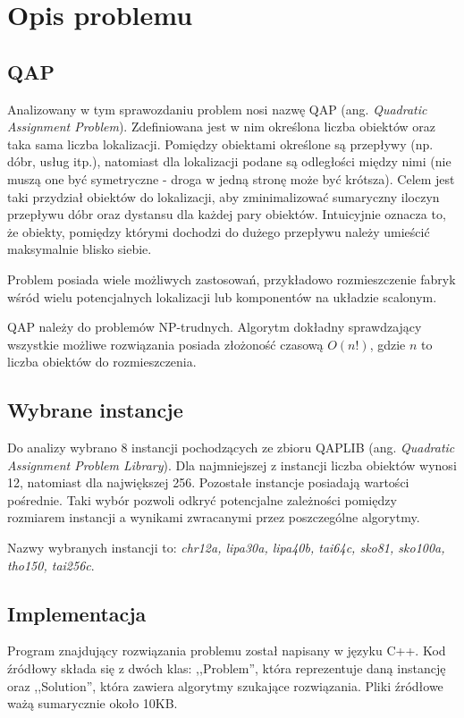 \documentclass{article}
\begin{document}


\section{Opis problemu}
\subsection{QAP}
Analizowany w tym sprawozdaniu problem nosi nazwę QAP (ang. \textit{Quadratic Assignment Problem}). Zdefiniowana jest w nim określona liczba obiektów oraz taka sama liczba lokalizacji. Pomiędzy obiektami określone są przepływy (np. dóbr, usług itp.), natomiast dla lokalizacji podane są odległości między nimi (nie muszą one być symetryczne - droga w jedną stronę może być krótsza). Celem jest taki przydział obiektów do lokalizacji, aby zminimalizować sumaryczny iloczyn przepływu dóbr oraz dystansu dla każdej pary obiektów. Intuicyjnie oznacza to, że obiekty, pomiędzy którymi dochodzi do dużego przepływu należy umieścić maksymalnie blisko siebie.
\par Problem posiada wiele możliwych zastosowań, przykładowo rozmieszczenie fabryk wśród wielu potencjalnych lokalizacji lub komponentów na układzie scalonym. 
\par QAP należy do problemów NP-trudnych. Algorytm dokładny sprawdzający wszystkie możliwe rozwiązania posiada złożoność czasową $O(n!)$, gdzie $n$ to liczba obiektów do rozmieszczenia.
\subsection{Wybrane instancje}
Do analizy wybrano 8 instancji pochodzących ze zbioru QAPLIB (ang. \textit{Quadratic Assignment Problem Library}). Dla najmniejszej z instancji liczba obiektów wynosi 12, natomiast dla największej 256. Pozostałe instancje posiadają wartości pośrednie. Taki wybór pozwoli odkryć potencjalne zależności pomiędzy rozmiarem instancji a wynikami zwracanymi przez poszczególne algorytmy.
\par Nazwy wybranych instancji to: \textit{chr12a, lipa30a, lipa40b, tai64c, sko81, sko100a, tho150, tai256c}.
\subsection{Implementacja}
Program znajdujący rozwiązania problemu został napisany w języku C++. Kod źródłowy składa się z dwóch klas: ,,Problem'', która reprezentuje daną instancję oraz ,,Solution'', która zawiera algorytmy szukające rozwiązania. Pliki źródłowe ważą sumarycznie około 10KB. 
\end{document}
